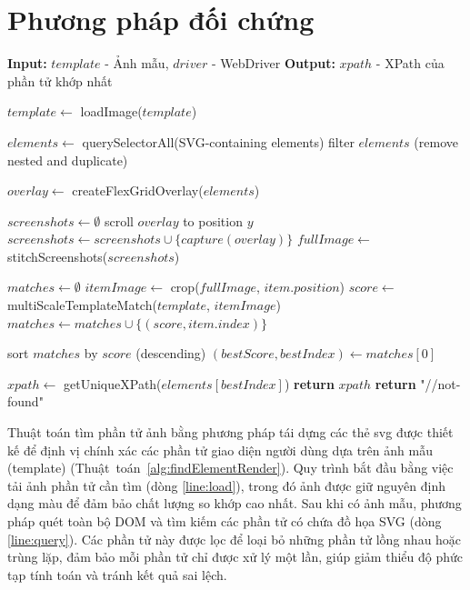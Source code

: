 \documentclass[a4paper, 12pt]{report}
\begin{document}
{\chapter{Phương pháp đối chứng}
\label{appendix:doichung}


\begin{algorithm}[H]
\caption{Tìm phần tử ảnh bằng phương pháp tái dựng các thẻ svg}
\label{alg:findElementRender}
\begin{algorithmic}[1]
    \STATE \textbf{Input: } $template$ - Ảnh mẫu, $driver$ - WebDriver
    \STATE \textbf{Output: } $xpath$ - XPath của phần tử khớp nhất
    
    \STATE $template \gets$ loadImage($template$) \label{line:load}
    
    \STATE $elements \gets$ querySelectorAll(SVG-containing elements) \label{line:query}
    \STATE filter $elements$ (remove nested and duplicate)
    
    \STATE $overlay \gets$ createFlexGridOverlay($elements$) \label{line:overlay}
    
    \STATE $screenshots \gets \emptyset$
        \STATE scroll $overlay$ to position $y$
        \STATE $screenshots \gets screenshots \cup \{capture(overlay)\}$
    \ENDFOR
    \STATE $fullImage \gets$ stitchScreenshots($screenshots$) \label{line:stitch}
    
    \STATE $matches \gets \emptyset$
        \STATE $itemImage \gets$ crop($fullImage$, $item.position$)
        \STATE $score \gets$ multiScaleTemplateMatch($template$, $itemImage$) \label{line:match}
        \STATE $matches \gets matches \cup \{(score, item.index)\}$
    \ENDFOR
    
    \STATE sort $matches$ by $score$ (descending)
    \STATE $(bestScore, bestIndex) \gets matches[0]$
    
        \STATE $xpath \gets$ getUniqueXPath($elements[bestIndex]$) \label{line:xpath}
        \STATE \textbf{return} $xpath$
    \ELSE
        \STATE \textbf{return} "//not-found"
    \ENDIF
\end{algorithmic}
\end{algorithm}

\clearpage

Thuật toán tìm phần tử ảnh bằng phương pháp tái dựng các thẻ svg được thiết kế để định vị chính xác các phần tử giao diện người dùng dựa trên ảnh mẫu (template) (Thuật~toán~\ref{alg:findElementRender}). Quy trình bắt đầu bằng việc tải ảnh phần tử cần tìm (dòng \ref{line:load}), trong đó ảnh được giữ nguyên định dạng màu để đảm bảo chất lượng so khớp cao nhất. Sau khi có ảnh mẫu, phương pháp quét toàn bộ DOM và tìm kiếm các phần tử có chứa đồ họa SVG (dòng \ref{line:query}). Các phần tử này được lọc để loại bỏ những phần tử lồng nhau hoặc trùng lặp, đảm bảo mỗi phần tử chỉ được xử lý một lần, giúp giảm thiểu độ phức tạp tính toán và tránh kết quả sai lệch.

}
\end{document}
